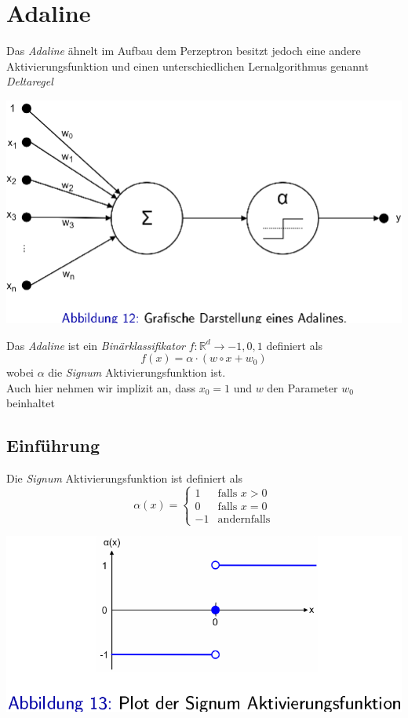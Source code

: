 \documentclass{report}
\begin{document}
  \section{Adaline}
  Das \textit{Adaline} ähnelt im Aufbau dem Perzeptron besitzt jedoch eine andere Aktivierungsfunktion und einen unterschiedlichen Lernalgorithmus genannt \textit{Deltaregel}
  \begin{center}
    \includegraphics[scale=.2125]{ml04_11}
  \end{center}
  Das \textit{Adaline} ist ein \textit{Binärklassifikator} $f: \mathbb{R}^d \rightarrow {-1, 0, 1}$ definiert als
  $$f(x) = \alpha\cdot(w\circ x + w_0)$$
  wobei $\alpha$ die \textit{Signum} Aktivierungsfunktion ist.\\	
  Auch hier nehmen wir implizit an, dass $x_0 = 1$ und $w$ den Parameter $w_0$ beinhaltet
  
  \subsection{Einführung}
  Die \textit{Signum} Aktivierungsfunktion ist definiert als
  \begin{equation*}
    \alpha(x) = \begin{cases}
      1 & \text{falls $x > 0$}\\
      0 & \text{falls $x = 0$}\\
      -1 & \text{andernfalls}
    \end{cases}
  \end{equation*}	
  
  \begin{center}	
    \includegraphics[scale=.2275]{ml04_12}
  \end{center}
  
\end{document}
